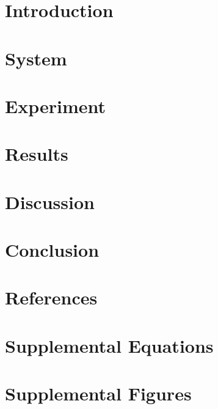 \documentclass[review,3p,authoryear]{elsarticle}
\begin{document}

\clearpage
\section{Introduction}\label{s:intro}

\section{System}\label{s:system}

\section{Experiment}\label{s:exp}

\section{Results}\label{s:results}

\section{Discussion}\label{s:discussion}

\section{Conclusion}\label{s:conclusion}
%
\clearpage
\section*{References}

\clearpage
\appendix\setcounter{figure}{0}
\section{Supplemental Equations}\label{a:eqs}

\clearpage
\section{Supplemental Figures}\label{a:figs}

\clearpage
\end{document}
